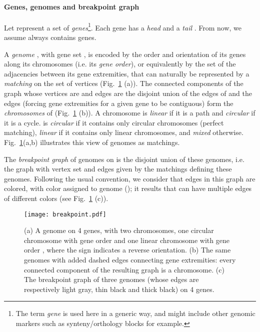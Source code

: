 \documentclass[10pt]{llncs}
\begin{document}
\paragraph{Genes, genomes and breakpoint graph}
Let  represent a set of  {\em
  genes}\footnote{The term {\em gene} is used here in a generic way,
  and might include other genomic markers such as synteny/orthology
  blocks for example.}. Each gene  has a {\em head}  and a
{\em tail} . From now, we assume  always contains  genes.

A {\em genome} , with gene set , is encoded by the order and
orientation of its genes along its chromosomes (i.e. its {\em gene
  order}), or equivalently by the set of the adjacencies between its
gene extremities, that can naturally be represented by a {\em
  matching} on the set of vertices  (Fig.~\ref{genomebreak} (a)). The connected components of the
graph whose vertices are  and edges are the disjoint union of
the edges of  and the edges  (forcing gene
extremities for a given gene to be contiguous) form the {\em
  chromosomes} of  (Fig.~\ref{genomebreak} (b)). A chromosome is
\emph{linear} if it is a path and \emph{circular} if it is a
cycle.  is {\em circular} if it contains only circular chromosomes
(perfect matching), {\em linear} if it contains only linear
chromosomes, and {\em mixed} otherwise.  Fig.~\ref{genomebreak}(a,b)
illustrates this view of genomes as matchings.

The {\em breakpoint graph}  of  genomes  on  is the disjoint union of these genomes, i.e. the
graph with vertex set  and edges given by the matchings defining
these  genomes. Following the usual convention, we consider that
edges in this graph are colored, with color  assigned to genome
 (); it results that  can
have multiple edges of different colors (see Fig.~\ref{genomebreak}
(c)). 

\begin{figure}
\begin{center}
  \texttt{[image: breakpoint.pdf]}
 \vspace*{-3mm}\caption{(a) A genome on 4 genes, with two chromosomes,
   one circular chromosome with gene order  and one linear
   chromosome with gene order , where the sign  indicates
   a reverse orientation. (b) The same genomes with added dashed edges
   connecting gene extremities: every connected component of the
   resulting graph is a chromosome. (c) The breakpoint graph of three
   genomes (whose edges are respectively light gray, thin black and
   thick black) on 4 genes.}
    \label{genomebreak}
\end{center}

\end{figure}
\end{document}
